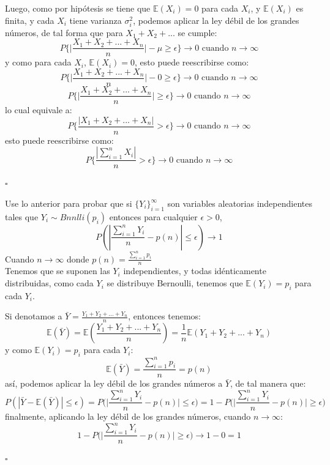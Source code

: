 \documentclass[11pt,a4paper]{report}
\begin{document}
\begin{enumerate}
{		Luego, como por hipótesis se tiene que $\mathbb{E}(X_i) = 0$ para cada 
		$X_i$, y $\mathbb{E}(X_i)$ es finita, y cada $X_i$ tiene varianza $\sigma^2_i$,
		podemos aplicar la ley débil de los grandes números, de tal forma
		que para $X_1 + X_2 + ...$ se cumple:
			$$ P\Big\{ \Big| \frac{X_1 + X_2 + ... + X_n}{n} \Big| - \mu \geq 
			\epsilon \Big\} \rightarrow 0 \text{ cuando } n \rightarrow \infty$$
		y como para cada $X_i$, $\mathbb{E}(X_i) = 0$, esto puede reescribirse como:
			$$ P\Big\{ \Big| \frac{X_1 + X_2 + ... + X_n}{n} \Big| - 0 \geq 
			\epsilon \Big\} \rightarrow 0 \text{ cuando } n \rightarrow \infty$$
			$$ P\Big\{ \Big| \frac{X_1 + X_2 + ... + X_n}{n} \Big| \geq 
			\epsilon \Big\} \rightarrow 0 \text{ cuando } n \rightarrow \infty$$
		lo cual equivale a:
			$$ P\Big\{ \frac{| X_1 + X_2 + ... + X_n |}{n}  > 
			\epsilon \Big\} \rightarrow 0 \text{ cuando } n \rightarrow \infty$$
		esto puede reescribirse como:
			$$ P\Big\{ \frac{| \sum_{i=1}^n X_i |}{n}  > 
			\epsilon \Big\} \rightarrow 0 \text{ cuando } n \rightarrow \infty$$
		\begin{flushright}
			$\square$
		\end{flushright}

	   Use lo anterior para probar que si $\lbrace Y_{i} \rbrace_{i=1}^{\infty}$ son variables aleatorias independientes tales que $Y_{i}\sim Bnnlli(p_{i})$ entonces para cualquier $\epsilon>0$, 
					$$P(|\frac{\sum_{i=1}^{n}Y_{i}}{n}-p(n)|\leq \epsilon)\rightarrow 1$$
	   Cuando $n\rightarrow \infty$ donde $p(n)=\frac{\sum_{i=1}^{n}p_{i}}{n}$\\

	   Tenemos que se suponen las $Y_i$ independientes, y todas idénticamente 
	   distribuidas, como cada $Y_i$ se distribuye Bernoulli, tenemos que 
	   $\mathbb{E}(Y_i) = p_i$ para cada $Y_i$.

	   Si denotamos a $\bar{Y} = \frac{Y_1 + Y_2 + ... + Y_n}{n}$, entonces 
	   tenemos:
			$$ \mathbb{E}(\bar{Y}) = \mathbb{E}(\frac{Y_1 + Y_2 + ... + Y_n}{n})
			   = \frac{1}{n} \mathbb{E}(Y_1 + Y_2 + ... + Y_n)$$
		y como $\mathbb{E}(Y_i) = p_i$ para cada $Y_i$:
			$$ \mathbb{E}(\bar{Y}) = \frac{\sum_{i = 1}^n p_i}{n} = p(n)$$
		así, podemos aplicar la ley débil de los grandes números a $\bar{Y}$, 
		de tal manera que:
			$$P(|\bar{Y} - \mathbb{E}(\bar{Y})| \leq \epsilon) 
			 = P\Big( \Big| \frac{\sum_{i=1}^n Y_i}{n} - p(n)\Big| \leq \epsilon \Big)
			 = 1 - P\Big( \Big| \frac{\sum_{i=1}^n Y_i}{n} - p(n)\Big| \geq \epsilon \Big)$$
		finalmente, aplicando la ley débil de los grandes números, cuando $n \rightarrow \infty$:
			$$ 1 - P\Big( \Big| \frac{\sum_{i=1}^n Y_i}{n} - p(n)\Big| \geq \epsilon \Big)
			  \rightarrow 1 - 0 = 1$$ 
		\begin{flushright}
			$\square$
		\end{flushright}

}
\end{enumerate}
\end{document}
